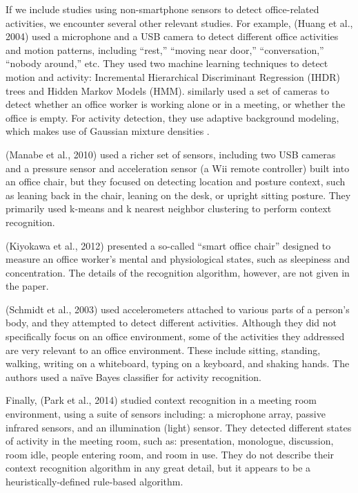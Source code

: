 If we include studies using non-smartphone sensors to detect office-related activities, we encounter several other relevant studies. For example, (Huang et al., 2004) %
used a microphone and a USB %
camera to detect different office activities and motion patterns, including ``rest,'' ``moving near door,'' ``conversation,'' ``nobody around,'' etc. They used two machine learning techniques to detect motion and activity: Incremental Hierarchical Discriminant Regression (IHDR) trees and Hidden Markov Models (HMM). \cite{danninger2008context} similarly used a set of cameras to detect whether an office worker is working alone or in a meeting, or whether the office is empty. For activity detection, they use adaptive background modeling, which makes use of Gaussian mixture densities \cite{stauffer1999adaptive}.

(Manabe et al., 2010) %
used a richer set of sensors, including two USB cameras and a pressure sensor and acceleration sensor (a Wii remote controller) built into an office chair, but they focused on detecting location and posture context, such as leaning back in the chair, leaning on the desk, or upright sitting posture. They primarily used k-means and k nearest neighbor %
clustering to perform context recognition.

(Kiyokawa et al., 2012) %
presented a so-called ``smart office chair'' designed to measure an office worker's mental and physiological states, such as sleepiness and concentration. The details of the recognition algorithm, however, are not given in the paper.

(Schmidt et al., 2003) %
used accelerometers attached to various parts of a person's body, and they attempted to detect different activities. Although they did not specifically focus on an office environment, some of the activities they addressed are very relevant to an office environment. These include sitting, standing, walking, writing on a whiteboard, typing on a keyboard, and shaking hands. The authors used a na\"{i}ve Bayes classifier for activity recognition.

Finally, (Park et al., 2014) %
studied context recognition in a meeting room environment, using a suite of sensors including: a microphone array, passive infrared sensors, and an illumination (light) sensor. They detected different states of activity in the meeting room, such as: presentation, monologue, discussion, room idle, people entering room, and room in use. They do not describe their context recognition algorithm in any great detail, but it appears to be a heuristically-defined rule-based algorithm.

